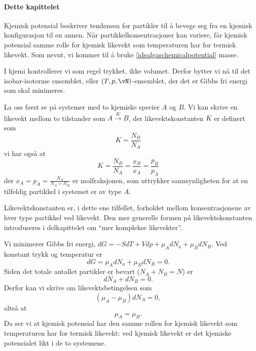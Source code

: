 \paragraph{Dette kapittelet}
Kjemisk potensial beskriver tendensen for partikler til å bevege seg fra en kjemisk konfigurasjon til en annen. Når partikkelkonsentrasjoner kan variere, får kjemisk potensial samme rolle for kjemisk likevekt som temperaturen har for termisk likevekt. Som nevnt, vi kommer til å bruke \eqref{idealgaschemicalpotential} masse. 

I kjemi kontrollerer vi som regel trykket, ikke volumet. Derfor bytter vi nå til det isobar-isoterme ensemblet, eller $(T,p,\vN)$-ensemblet, der det er Gibbs fri energi som skal minimeres.

La oss først se på systemer med to kjemiske specier $A$ og $B$. Vi kan skrive en likevekt mellom to tilstander som $A\xrightarrow{K}B$, der likevektskonstanten $K$ er definert som
\begin{equation}
	K = \frac{N_B}{N_A}
\end{equation}
vi har også at
\begin{equation}
	K = \frac{N_B}{N_A} = \frac{x_B}{x_A} = \frac{p_B}{p_A}
\end{equation}
der $x_A=p_A=\frac{N_A}{N_A+N_B}$ er molfraksjonen, som uttrykker sannsynligheten for at en tilfeldig partikkel i systemet er av type $A$.

Likevektskonstanten er, i dette ene tilfellet, forholdet mellom konsentrasjonene av hver type partikkel ved likevekt. Den mer generelle formen på likevektskonstanten introduseres i delkapittelet om ``mer komplekse likevekter''.

Vi minimerer Gibbs fri energi, $dG=-SdT+Vdp+\mu_AdN_a+\mu_BdN_B$. Ved konstant trykk og temperatur er 
\begin{equation}
	dG=\mu_AdN_a+\mu_BdN_B=0.	
\end{equation}
Siden det totale antallet partikler er bevart ($N_A+N_B=N$) er 
\begin{equation}
	dN_A+dN_B=0.	
\end{equation}
Derfor kan vi skrive om likevektsbetingelsen som 
\begin{equation}
	(\mu_A-\mu_B)dN_A=0,
\end{equation}
altså at 
\begin{equation}
	\mu_A=\mu_B.
\end{equation} 
Da ser vi at kjemisk potensial har den samme rollen for kjemisk likevekt som temperaturen har for termisk likevekt: ved kjemisk likevekt er det kjemiske potensialet likt i de to systemene.

